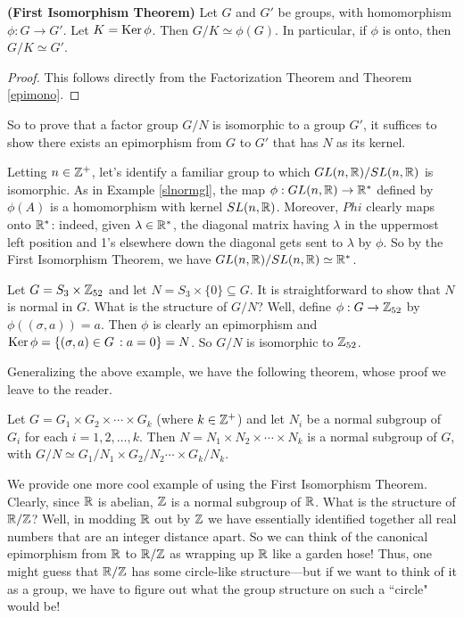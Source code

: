 \begin{thm}\label{}\textbf{(First Isomorphism Theorem)} Let $G$ and $G'$
be groups, with homomorphism $\phi:G \rightarrow G'$.  Let $K=\operatorname{Ker}
\phi$. Then $G/K \simeq \phi(G)$. In particular, if $\phi$ is onto,
then $G/K\simeq G'$.\end{thm}

\begin{proof} This follows directly from the Factorization Theorem and
Theorem \ref{epimono}.\end{proof}

 So to prove that a factor group $G/N$ is isomorphic to a group
$G'$, it suffices to show there exists an epimorphism from $G$ to
$G'$ that has $N$ as its kernel.

\begin{example}{} Letting $n\in \mathbb{Z}^+$, let's identify a familiar group to which
$GL(n,\mathbb{R})/SL(n,\mathbb{R})$ is isomorphic.  As in Example
\ref{slnormgl}, the map $\phi:GL(n,\mathbb{R})\to \mathbb{R}^*$ defined by
$\phi(A)$ is a homomorphism with kernel $SL(n,\mathbb{R})$.  Moreover,
$Phi$ clearly maps onto $\mathbb{R}^*$: indeed, given $\lambda \in
\mathbb{R}^*$, the diagonal matrix having $\lambda$ in the uppermost left
position and 1's elsewhere down the diagonal gets sent to $\lambda$
by $\phi$.  So by the First Isomorphism Theorem, we have
$GL(n,\mathbb{R})/SL(n,\mathbb{R}) \simeq \mathbb{R}^*$. \end{example}

\begin{example}{} Let $G=S_3\times \mathbb{Z}_{52}$ and let $N=S_3 \times
\{0\}\subseteq G$.  It is straightforward to show that $N$ is normal
in $G$.  What is the structure of $G/N$? Well, define $\phi:G\to
\mathbb{Z}_{52}$ by $\phi((\sigma, a))=a$.  Then $\phi$ is clearly an
epimorphism and $\operatorname{Ker} \phi=\{(\sigma,a)\in G\,:a=0\}=N$. So $G/N$ is
isomorphic to $\mathbb{Z}_{52}$. \end{example}

Generalizing the above example, we have the following theorem, whose
proof we leave to the reader.

\begin{thm}\label{} Let $G=G_1\times G_2 \times \cdots \times G_k$ (where
$k\in \mathbb{Z}^+$) and let $N_i$ be a normal subgroup of $G_i$ for each
$i=1,2,\ldots, k$.  Then $N=N_1 \times N_2 \times \cdots \times N_k$
is a normal subgroup of $G$, with $G/N \simeq G_1/N_1 \times G_2/N_2
\cdots \times G_k/N_k.$ \end{thm}

We provide one more cool example of using the First Isomorphism
Theorem. Clearly, since $\mathbb{R}$ is abelian, $\mathbb{Z}$ is a normal
subgroup of $\mathbb{R}$.  What is the structure of $\mathbb{R}/\mathbb{Z}$?  Well, in
modding $\mathbb{R}$ out by $\mathbb{Z}$ we have essentially identified together
all real numbers that are an integer distance apart.  So we can
think of the canonical epimorphism from $\mathbb{R}$ to $\mathbb{R}/\mathbb{Z}$ as
wrapping up $\mathbb{R}$ like a garden hose!  Thus, one might guess that
$\mathbb{R}/\mathbb{Z}$ has some circle-like structure---but if we want to think
of it as a group, we have to figure out what the group structure on
such a ``circle" would be!

